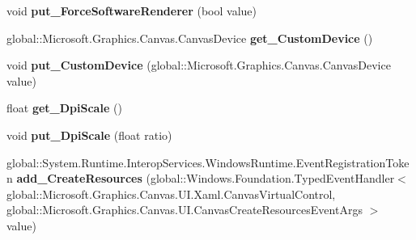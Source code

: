 \begin{DoxyCompactItemize}
void {\bfseries put\+\_\+\+Force\+Software\+Renderer} (bool value)
\item 
\mbox{\label{interface_microsoft_1_1_graphics_1_1_canvas_1_1_u_i_1_1_xaml_1_1_i_canvas_virtual_control_a3a4397e75ab2f3349c04e22eb675175b}} 
global\+::\+Microsoft.\+Graphics.\+Canvas.\+Canvas\+Device {\bfseries get\+\_\+\+Custom\+Device} ()
\item 
\mbox{\label{interface_microsoft_1_1_graphics_1_1_canvas_1_1_u_i_1_1_xaml_1_1_i_canvas_virtual_control_a537ad643145f8b36cfe1543eb61d3eb8}} 
void {\bfseries put\+\_\+\+Custom\+Device} (global\+::\+Microsoft.\+Graphics.\+Canvas.\+Canvas\+Device value)
\item 
\mbox{\label{interface_microsoft_1_1_graphics_1_1_canvas_1_1_u_i_1_1_xaml_1_1_i_canvas_virtual_control_a3a41a9a5588a50fb8543bc7b2fe40a83}} 
float {\bfseries get\+\_\+\+Dpi\+Scale} ()
\item 
\mbox{\label{interface_microsoft_1_1_graphics_1_1_canvas_1_1_u_i_1_1_xaml_1_1_i_canvas_virtual_control_a41445930b2afc9f40e2817d563c3b188}} 
void {\bfseries put\+\_\+\+Dpi\+Scale} (float ratio)
\item 
\mbox{\label{interface_microsoft_1_1_graphics_1_1_canvas_1_1_u_i_1_1_xaml_1_1_i_canvas_virtual_control_a07dc4062e5aad8e7a25c912a888eb205}} 
global\+::\+System.\+Runtime.\+Interop\+Services.\+Windows\+Runtime.\+Event\+Registration\+Token {\bfseries add\+\_\+\+Create\+Resources} (global\+::\+Windows.\+Foundation.\+Typed\+Event\+Handler$<$ global\+::\+Microsoft.\+Graphics.\+Canvas.\+U\+I.\+Xaml.\+Canvas\+Virtual\+Control, global\+::\+Microsoft.\+Graphics.\+Canvas.\+U\+I.\+Canvas\+Create\+Resources\+Event\+Args $>$ value)
\item 
\mbox{\label{interface_microsoft_1_1_graphics_1_1_canvas_1_1_u_i_1_1_xaml_1_1_i_canvas_virtual_control_af71d0732162524cbb84e8775794f761d}} 

\end{DoxyCompactItemize}
